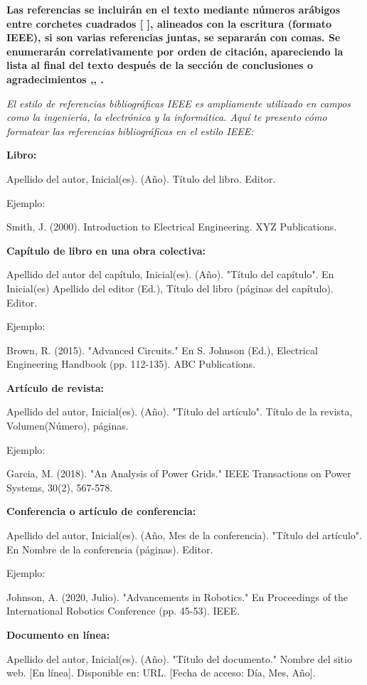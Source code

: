 \documentclass[a4paper,twocolumn,10.5pt]{article}
\begin{document}
\textbf{Las referencias  se incluirán en el texto mediante números arábigos entre corchetes cuadrados  [ ], alineados con la escritura (formato IEEE), si son varias referencias juntas, se separarán con comas. Se enumerarán correlativamente
por orden de citación, apareciendo la lista al final del texto después de la sección de conclusiones o agradecimientos \cite{1},\cite{2}, \cite{3}.
}

\emph{
El estilo de referencias bibliográficas IEEE  es ampliamente utilizado en campos como la ingeniería, la electrónica y la informática. Aquí te presento cómo formatear las referencias bibliográficas en el estilo IEEE:}

\textbf{Libro:}

Apellido del autor, Inicial(es). (Año). Título del libro. Editor.

Ejemplo:

Smith, J. (2000). Introduction to Electrical Engineering. XYZ Publications.


\textbf{Capítulo de libro en una obra colectiva:}

Apellido del autor del capítulo, Inicial(es). (Año). "Título del capítulo". En Inicial(es) Apellido del editor (Ed.), Título del libro (páginas del capítulo). Editor.

Ejemplo:

Brown, R. (2015). "Advanced Circuits." En S. Johnson (Ed.), Electrical Engineering Handbook (pp. 112-135). ABC Publications.

\textbf{Artículo de revista:}

Apellido del autor, Inicial(es). (Año). "Título del artículo". Título de la revista, Volumen(Número), páginas.

Ejemplo:

Garcia, M. (2018). "An Analysis of Power Grids." IEEE Transactions on Power Systems, 30(2), 567-578.


\textbf{Conferencia o artículo de conferencia:}

Apellido del autor, Inicial(es). (Año, Mes de la conferencia). "Título del artículo". En Nombre de la conferencia (páginas). Editor.

Ejemplo:

Johnson, A. (2020, Julio). "Advancements in Robotics." En Proceedings of the International Robotics Conference (pp. 45-53). IEEE.

\textbf{
Documento en línea:}

Apellido del autor, Inicial(es). (Año). "Título del documento." Nombre del sitio web. [En línea]. Disponible en: URL. [Fecha de acceso: Día, Mes, Año].
\end{document}
